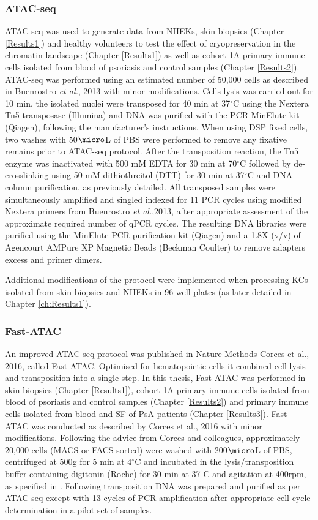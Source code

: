 \subsubsection{ATAC-seq}

ATAC-seq was used to generate data from NHEKs, skin biopsies (Chapter \ref{Results1}) and healthy volunteers to test the effect of cryopreservation in the chromatin landscape (Chapter \ref{Results1}) as well as cohort 1A primary immune cells isolated from blood of psoriasis and control samples (Chapter \ref{Results2}). ATAC-seq was performed using an estimated number of 50,000 cells as described in Buenrostro \textit{et al.}, 2013 with minor modifications. Cells lysis was carried out for 10 min, the isolated nuclei were transposed for 40 min at 37{$^\circ$}C using the Nextera Tn5 transposase (Illumina) and DNA was purified with the PCR MinElute kit (Qiagen), following the manufacturer's instructions. When using DSP fixed cells, two washes with 50$\micro$L of PBS were performed to remove any fixative remains prior to ATAC-seq protocol. After the transposition reaction, the Tn5 enzyme was inactivated with 500 mM EDTA for 30 min at 70{$^\circ$}C followed by de-crosslinking using 50 mM dithiothreitol (DTT) for 30 min at 37{$^\circ$}C and DNA column purification, as previously detailed.  All transposed samples were simultaneously amplified and singled indexed for 11 PCR cycles using modified Nextera primers from Buenrostro \textit{et al.},2013, after appropriate assessment of the approximate required number of qPCR cycles. The resulting DNA libraries were purified using the MinElute PCR purification kit (Qiagen) and a 1.8X (v/v) of Agencourt AMPure XP Magnetic Beads (Beckman Coulter) to remove adapters excess and primer dimers.

Additional modifications of the protocol were implemented when processing KCs isolated from skin biopsies and NHEKs in 96-well plates \parencite{Bao2015} (as later detailed in Chapter \ref{ch:Results1}).

\subsubsection{Fast-ATAC}
An improved ATAC-seq protocol was published in Nature Methods Corces et al., 2016, called Fast-ATAC. Optimised for hematopoietic cells it combined cell lysis and transposition into a single step. In this thesis, Fast-ATAC was performed in skin biopsies (Chapter \ref{Results1}), cohort 1A primary immune cells isolated from blood of psoriasis and control samples (Chapter \ref{Results2}) and primary immune cells isolated from blood and SF of PsA patients (Chapter \ref{Results3}). Fast-ATAC was conducted as described by Corces et al., 2016 with minor modifications. Following the advice from Corces and colleagues, approximately 20,000 cells (MACS or FACS sorted) were washed with 200$\micro$L of PBS, centrifuged at 500g for 5 min at 4$^\circ$C and incubated in the lysis/transposition buffer containing digitonin (Roche) for 30 min at 37{$^\circ$}C and agitation at 400rpm, as specified in \parencite{Corces2016}. Following transposition DNA was prepared and purified as per ATAC-seq except with 13 cycles of PCR amplification after appropriate cell cycle determination in a pilot set of samples.

